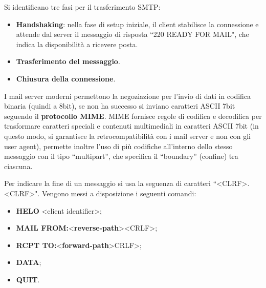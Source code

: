 \documentclass[11pt, italian, openany]{book}
\begin{document}
\begin{sloppypar}
\begin{itemize}[topsep=0pt]
	Si identificano tre fasi per il trasferimento SMTP:
	\vspace{-3.5mm}
	\begin{itemize}
		\itemsep-0.3em
		\item \textbf{Handshaking}: nella fase di setup iniziale, il client stabilisce la connessione e attende dal server il messaggio di risposta
		``220 READY FOR MAIL", che indica la disponibilit\`a a ricevere posta.
		\item \textbf{Trasferimento del messaggio}.
		\item \textbf{Chiusura della connessione}.
	\end{itemize}

	I mail server moderni permettono la negoziazione per l'invio di dati in codifica binaria (quindi a 8bit), se non ha successo si inviano caratteri ASCII 7bit
	seguendo il \textbf{protocollo MIME}. MIME fornisce regole di codifica e decodifica per trasformare caratteri speciali e contenuti multimediali in caratteri
	ASCII 7bit (in questo modo, si garantisce la retrocompatibilit\`a con i mail server e non con gli user agent), permette inoltre l'uso di pi\`u codifiche
	all'interno dello stesso messaggio con il tipo ``multipart'', che specifica il ``boundary'' (confine) tra ciascuna.

	Per indicare la fine di un messaggio si usa la seguenza di caratteri ``\textless{CLRF}\textgreater{.}\textless{CLRF}\textgreater{"}. Vengono messi a
	disposizione i seguenti comandi:
	\vspace{-3.5mm}
	\begin{itemize}
		\itemsep-0.3em
		\item \textbf{HELO} \textless{client identifier}\textgreater{;}
		\item \textbf{MAIL FROM:}\textless{\textbf{reverse-path}\textgreater{\textless{CRLF}\textgreater{;}}}
		\item \textbf{RCPT TO:}\textless{\textbf{forward-path}\textgreater{CRLF\textgreater{;}}}
		\item \textbf{DATA};
		\item \textbf{QUIT}.
	\end{itemize}


\end{itemize}
\end{sloppypar}
\end{document}
